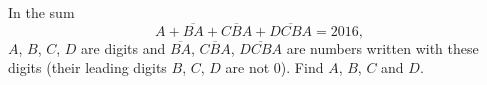 In the sum
\[
A+\overline{BA}+\overline{CBA}+\overline{DCBA}=2016,
\]
$A$, $B$, $C$, $D$ are digits and $\overline{BA}$, $\overline{CBA}$, $\overline{DCBA}$ are numbers written with these digits (their leading digits $B$, $C$, $D$ are not $0$). Find $A$, $B$, $C$ and $D$.
